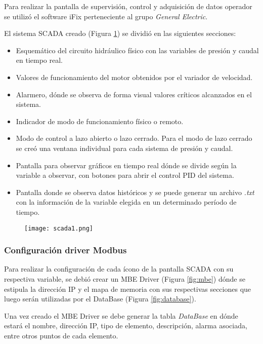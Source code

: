 Para realizar la pantalla de supervisión, control y adquisición de datos operador se utilizó el software iFix perteneciente al grupo \textit{General Electric}.

El sistema SCADA creado (Figura \ref{fig:scada1}) se dividió en las siguientes secciones:
\begin{itemize}
	\item Esquemático del circuito hidráulico físico con las variables de presión y caudal en tiempo real.
	\item Valores de funcionamiento del motor obtenidos por el variador de velocidad.
	\item Alarmero, dónde se observa de forma visual valores críticos alcanzados en el sistema.
	\item Indicador de modo de funcionamiento físico o remoto.
	\item Modo de control a lazo abierto o lazo cerrado.
	\subitem Para el modo de lazo cerrado se creó una ventana individual para cada sistema de presión y caudal.
	\item Pantalla para observar gráficos en tiempo real dónde se divide según la variable a observar, con botones para abrir el control PID del sistema.
	\item Pantalla donde se observa datos históricos y se puede generar un archivo \textit{.txt} con la información de la variable elegida en un determinado período de tiempo.
\end{itemize} 

\begin{figure}[htb]
	\centering
	\texttt{[image: scada1.png]}
	\label{fig:scada1}
\end{figure}


\subsubsection{Configuración driver Modbus}
Para realizar la configuración de cada ícono de la pantalla SCADA con su respectiva variable, se debió crear un MBE Driver (Figura \ref{fig:mbe}) dónde se estipula la dirección IP y el mapa de memoria con sus respectivas secciones que luego serán utilizadas por el DataBase (Figura \ref{fig:database}). 

Una vez creado el MBE Driver se debe generar la tabla \textit{DataBase} en dónde estará el nombre, dirección IP, tipo de elemento, descripción, alarma asociada, entre otros puntos de cada elemento.

